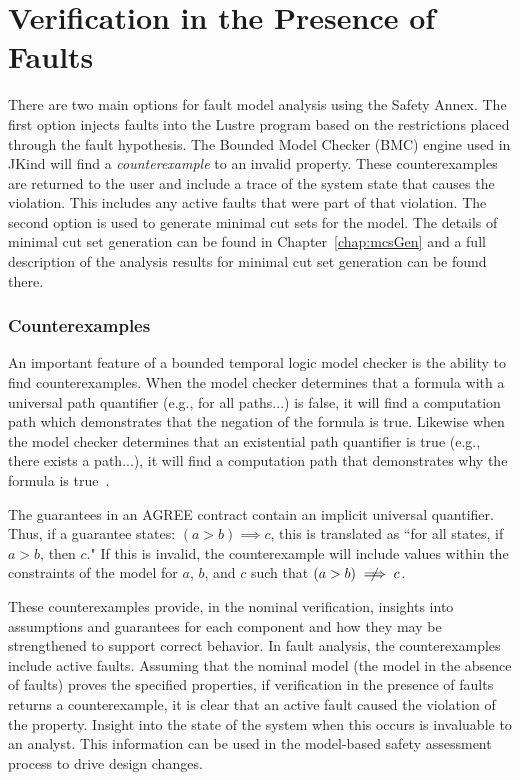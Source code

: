 \section{Verification in the Presence of Faults}
\label{sec:analysisResults}
There are two main options for fault model analysis using the Safety Annex. The first option injects faults into the Lustre program based on the restrictions placed through the fault hypothesis. The Bounded Model Checker (BMC) engine used in JKind will find a {\em counterexample} to an invalid property. These counterexamples are returned to the user and include a trace of the system state that causes the violation. This includes any active faults that were part of that violation. The second option is used to generate minimal cut sets for the model. The details of minimal cut set generation can be found in Chapter~\ref{chap:mcsGen} and a full description of the analysis results for minimal cut set generation can be found there. 

\subsubsection{Counterexamples}
An important feature of a bounded temporal logic model checker is the ability to find counterexamples. When the model checker determines that a formula with a universal path quantifier (e.g., for all paths...) is false, it will find a computation path which demonstrates that the negation of the formula is true. Likewise when the model checker determines that an existential path quantifier is true (e.g., there exists a path...), it will find a computation path that demonstrates why the formula is true~\cite{clarke2018model}. 

The guarantees in an AGREE contract contain an implicit universal quantifier. Thus, if a guarantee states: $(a > b) \implies c$, this is translated as ``for all states, if $a > b$, then $c$." If this is invalid, the counterexample will include values within the constraints of the model for $a$, $b$, and $c$ such that $(a > b) \centernot \implies c$.

These counterexamples provide, in the nominal verification, insights into assumptions and guarantees for each component and how they may be strengthened to support correct behavior. In fault analysis, the counterexamples include active faults. Assuming that the nominal model (the model in the absence of faults) proves the specified properties, if verification in the presence of faults returns a counterexample, it is clear that an active fault caused the violation of the property. Insight into the state of the system when this occurs is invaluable to an analyst. This information can be used in the model-based safety assessment process to drive design changes. 


